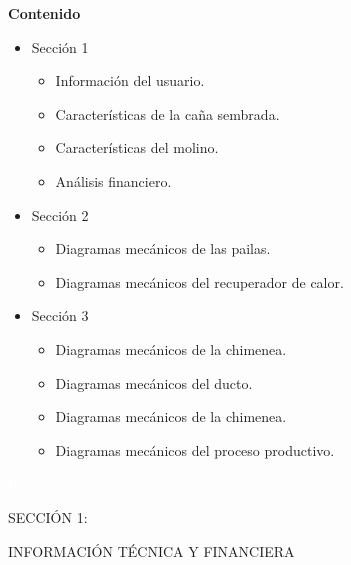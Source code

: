 \documentclass{article}%
\begin{document}
\newpage%
\begin{large}%
\begin{Large}%
\textbf{Contenido}%
\end{Large}%
\begin{itemize}%
\item%
Sección 1%
\begin{itemize}%
\item%
Información del usuario.%
\item%
Características de la caña sembrada.%
\item%
Características del molino.%
\item%
Análisis financiero.%
\end{itemize}%
\item%
Sección 2%
\begin{itemize}%
\item%
Diagramas mecánicos de las pailas.%
\item%
Diagramas mecánicos del recuperador de calor.%
\end{itemize}%
\item%
Sección 3%
\begin{itemize}%
\item%
Diagramas mecánicos de la chimenea.%
\item%
Diagramas mecánicos del ducto.%
\item%
Diagramas mecánicos de la chimenea.%
\item%
Diagramas mecánicos del proceso productivo.%
\end{itemize}%
\end{itemize}%
\end{large}%
\newpage%
\begin{center}%
\textcolor{white}{ 
HH
}%
\linebreak%
\linebreak%
\linebreak%
\linebreak%
\linebreak%
\linebreak%
\linebreak%
\linebreak%
\linebreak%
\linebreak%
\linebreak%
\linebreak%
\linebreak%
\linebreak%
\linebreak%
\begin{Huge}%
SECCIÓN 1:%
\end{Huge}%
\linebreak%
\begin{Huge}%
INFORMACIÓN TÉCNICA Y FINANCIERA%
\end{Huge}%
\end{center}%
\end{document}
